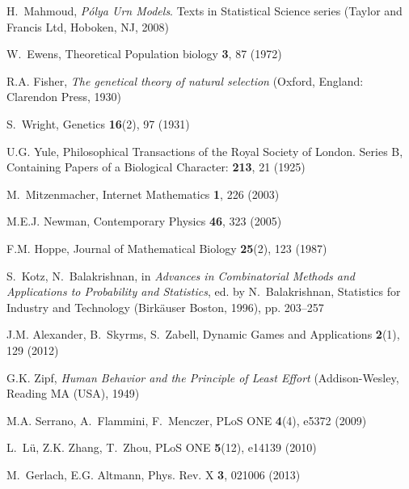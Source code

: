 \documentclass[graybox]{svmult}
\begin{document}
\begin{thebibliography}{10}
H.~Mahmoud, \emph{P\'olya Urn Models}.
\newblock Texts in Statistical Science series (Taylor and Francis Ltd, Hoboken,
  NJ, 2008)

W.~Ewens, Theoretical Population biology \textbf{3}, 87 (1972)

R.A. Fisher, \emph{The genetical theory of natural selection} (Oxford, England:
  Clarendon Press, 1930)

S.~Wright, Genetics \textbf{16}(2), 97 (1931)

U.G. Yule, Philosophical Transactions of the Royal Society of London. Series B,
  Containing Papers of a Biological Character: \textbf{213}, 21 (1925)

M.~Mitzenmacher, Internet Mathematics \textbf{1}, 226 (2003)

M.E.J. Newman, Contemporary Physics \textbf{46}, 323 (2005)

F.M. Hoppe, Journal of Mathematical Biology \textbf{25}(2), 123 (1987)

S.~Kotz, N.~Balakrishnan, in \emph{Advances in Combinatorial Methods and
  Applications to Probability and Statistics}, ed. by N.~Balakrishnan,
  Statistics for Industry and Technology (Birk{\"a}user Boston, 1996), pp.
  203--257

J.M. Alexander, B.~Skyrms, S.~Zabell, Dynamic Games and Applications
  \textbf{2}(1), 129 (2012)

G.K. Zipf, \emph{Human Behavior and the Principle of Least Effort}
  (Addison-Wesley, Reading MA (USA), 1949)

M.A. Serrano, A.~Flammini, F.~Menczer, PLoS ONE \textbf{4}(4), e5372 (2009)

L.~L\"u, Z.K. Zhang, T.~Zhou, PLoS ONE \textbf{5}(12), e14139 (2010)

M.~Gerlach, E.G. Altmann, Phys. Rev. X \textbf{3}, 021006 (2013)

\end{thebibliography}
\end{document}
